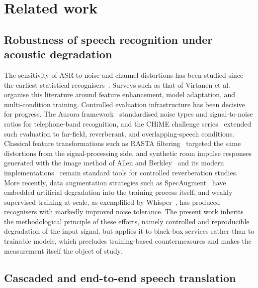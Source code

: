 \section{Related work}
\label{sec:related}

\subsection{Robustness of speech recognition under acoustic degradation}

The sensitivity of ASR to noise and channel distortions has been studied since
the earliest statistical recognisers~\citep{lippmann1997speech}. Surveys such
as that of Virtanen et al.~\citep{li2014overview} organise this
literature around feature enhancement, model adaptation, and multi-condition
training. Controlled evaluation infrastructure has been decisive for
progress. The Aurora framework~\citep{pearce2000aurora} standardised noise
types and signal-to-noise ratios for telephone-band recognition, and the CHiME
challenge series~\citep{barker2018fifth} extended such evaluation to
far-field, reverberant, and overlapping-speech conditions. Classical feature
transformations such as RASTA filtering~\citep{hermansky1994rasta} targeted the
same distortions from the signal-processing side, and synthetic room impulse
responses generated with the image method of Allen and
Berkley~\citep{allen1979image} and its modern
implementations~\citep{habets2006room} remain standard tools for controlled
reverberation studies. More recently, data augmentation strategies such as
SpecAugment~\citep{park2019specaugment} have embedded artificial degradation
into the training process itself, and weakly supervised training at scale, as
exemplified by Whisper~\citep{radford2023robust}, has produced recognisers
with markedly improved noise tolerance. The present work inherits the
methodological principle of these efforts, namely controlled and reproducible
degradation of the input signal, but applies it to black-box services rather
than to trainable models, which precludes training-based countermeasures and
makes the measurement itself the object of study.

\subsection{Cascaded and end-to-end speech translation}

